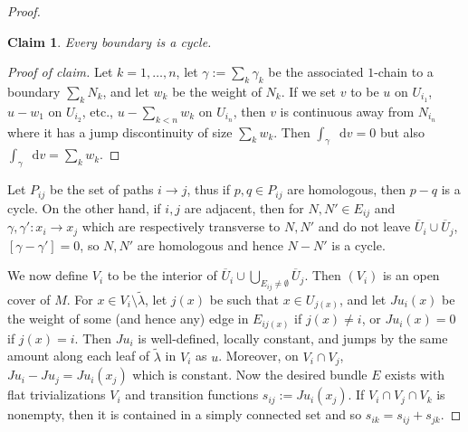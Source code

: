 \documentclass[reqno,11pt]{amsart}
\newcommand*\dif{\mathop{}\!\mathrm{d}}
\newtheorem*{claim}{Claim}
\theoremstyle{definition}
\numberwithin{equation}{section}
\begin{document}
\begin{proof}
\begin{claim}
Every boundary is a cycle.
\end{claim}
\begin{proof}[Proof of claim]
Let $k = 1, \dots, n$, let $\gamma := \sum_k \gamma_k$ be the associated $1$-chain to a boundary $\sum_k N_k$, and let $w_k$ be the weight of $N_k$.
If we set $v$ to be $u$ on $U_{i_1}$, $u - w_1$ on $U_{i_2}$, etc., $u - \sum_{k < n} w_k$ on $U_{i_n}$, then $v$ is continuous away from $N_{i_n}$ where it has a jump discontinuity of size $\sum_k w_k$.
Then $\int_\gamma \dif v = 0$ but also $\int_\gamma \dif v = \sum_k w_k$.
\end{proof}

Let $P_{ij}$ be the set of paths $i \to j$, thus if $p, q \in P_{ij}$ are homologous, then $p - q$ is a cycle.
On the other hand, if $i, j$ are adjacent, then for $N, N' \in E_{ij}$ and $\gamma, \gamma': x_i \to x_j$ which are respectively transverse to $N, N'$ and do not leave $\overline U_i \cup \overline U_j$, $[\gamma - \gamma'] = 0$, so $N, N'$ are homologous and hence $N - N'$ is a cycle.

We now define $V_i$ to be the interior of $\overline U_i \cup \bigcup_{E_{ij} \neq \emptyset} \overline U_j$.
Then $(V_i)$ is an open cover of $M$.
For $x \in V_i \setminus \tilde \lambda$, let $j(x)$ be such that $x \in U_{j(x)}$, and let $Ju_i(x)$ be the weight of some (and hence any) edge in $E_{ij(x)}$ if $j(x) \neq i$, or $Ju_i(x) = 0$ if $j(x) = i$.
Then $Ju_i$ is well-defined, locally constant, and jumps by the same amount along each leaf of $\tilde \lambda$ in $V_i$ as $u$.
Moreover, on $V_i \cap V_j$, $Ju_i - Ju_j = Ju_i(x_j)$ which is constant.
Now the desired bundle $E$ exists with flat trivializations $V_i$ and transition functions $s_{ij} := Ju_i(x_j)$.
If $V_i \cap V_j \cap V_k$ is nonempty, then it is contained in a simply connected set and so $s_{ik} = s_{ij} + s_{jk}$.
\end{proof}
\end{document}
